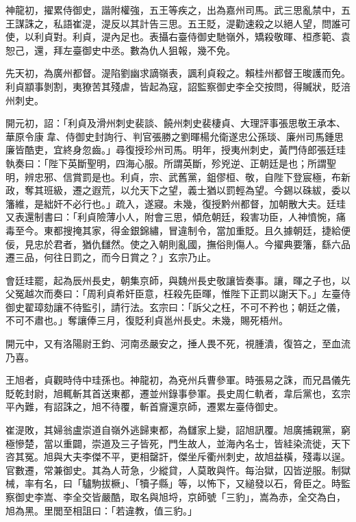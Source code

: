 \begin{pinyinscope}
 神龍初，擢累侍御史，諧附權強，五王等疾之，出為嘉州司馬。武三思亂禁中，五王謀誅之，私語崔湜，湜反以其計告三思。五王貶，湜勸速殺之以絕人望，問誰可使，以利貞對。利貞，湜內足也。表攝右臺侍御史馳嶺外，矯殺敬暉、桓彥範、袁恕己，還，拜左臺御史中丞。數為仇人狙報，幾不免。



 先天初，為廣州都督。湜陷劉幽求謫嶺表，諷利貞殺之。賴桂州都督王晙護而免。利貞顓事剝割，夷獠苦其殘虐，皆起為寇，詔監察御史李全交按問，得贓狀，貶涪州刺史。



 開元初，詔：「利貞及滑州刺史裴談、饒州刺史裴棲貞、大理評事張思敬王承本、華原令康韋、侍御史封詢行、判官張勝之劉暉楊允衛遂忠公孫琰、廉州司馬鍾思廉皆酷吏，宜終身忽齒。」尋復授珍州司馬。明年，授夷州刺史，黃門侍郎張廷珪執奏曰：「陛下英斷聖明，四海心服。所謂英斷，殄兇逆、正朝廷是也；所謂聖明，辨忠邪、信賞罰是也。利貞，宗、武舊黨，鉏僇桓、敬，自陛下登宸極，布新政，奪其班級，遷之遐荒，以允天下之望，義士猶以罰輕為望。今錫以硃紱，委以籓維，是絀奸不必行也。」疏入，遂寢。未幾，復授黔州都督，加朝散大夫。廷珪又表還制書曰：「利貞險薄小人，附會三思，傾危朝廷，殺害功臣，人神憤惋，痛毒至今。東都搜掩其家，得金銀錦繡，冒違制令，當加重貶。且久據朝廷，捷給便佞，見忠於君者，猶仇讎然。使之入朝則亂國，撫俗則傷人。今擢典要籓，繇六品遷三品，何往日罰之，而今日賞之？」玄宗乃止。



 會廷珪罷，起為辰州長史，朝集京師，與魏州長史敬讓皆奏事。讓，暉之子也，以父冤越次而奏曰：「周利貞希奸臣意，枉殺先臣暉，惟陛下正罰以謝天下。」左臺侍御史翟璋劾讓不待監引，請行法。玄宗曰：「訴父之枉，不可不矜也；朝廷之儀，不可不肅也。」奪讓俸三月，復貶利貞邕州長史。未幾，賜死梧州。



 開元中，又有洛陽尉王鈞、河南丞嚴安之，捶人畏不死，視腫潰，復笞之，至血流乃喜。



 王旭者，貞觀時侍中珪孫也。神龍初，為兗州兵曹參軍。時張易之誅，而兄昌儀先貶乾封尉，旭輒斬其首送東都，遷並州錄事參軍。長史周仁軌者，韋后黨也，玄宗平內難，有詔誅之，旭不待覆，斬首齎還京師，遷累左臺侍御史。



 崔湜敗，其婦翁盧崇道自嶺外逃歸東都，為讎家上變，詔旭訊覆。旭廣捕親黨，窮極慘楚，當以重闢，崇道及三子皆死，門生故人，並海內名士，皆絓染流徙，天下咨其冤。旭與大夫李傑不平，更相罄訐，傑坐斥衢州刺史，故旭益橫，殘毒以逞。官數遷，常兼御史。其為人苛急，少縱貸，人莫敢與忤。每治獄，囚皆逆服。制獄械，率有名，曰「驢駒拔橛」、「犢子縣」等，以怖下，又縋發以石，脅臣之。時監察御史李嵩、李全交皆嚴酷，取名與旭埒，京師號「三豹」，嵩為赤，全交為白，旭為黑。里閭至相詛曰：「若違教，值三豹。」




\end{pinyinscope}
